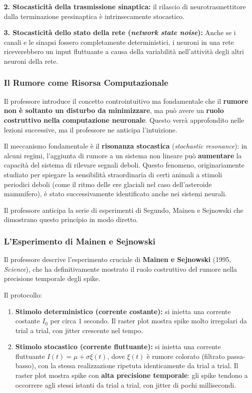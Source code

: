 \textbf{2. Stocasticità della trasmissione sinaptica:} il rilascio di neurotrasmettitore dalla terminazione presinaptica è intrinsecamente stocastico. 

\textbf{3. Stocasticità dello stato della rete (\textit{network state noise}):}
Anche se i canali e le sinapsi fossero completamente deterministici, i neuroni in una rete riceverebbero un input fluttuante a causa della variabilità nell'attività degli altri neuroni della rete. 

\subsubsection{Il Rumore come Risorsa Computazionale}

Il professore introduce il concetto controintuitivo ma fondamentale che il \textbf{rumore non è soltanto un disturbo da minimizzare}, ma può avere un \textbf{ruolo costruttivo nella computazione neuronale}. Questo verrà approfondito nelle lezioni successive, ma il professore ne anticipa l'intuizione.

Il meccanismo fondamentale è il \textbf{risonanza stocastica} (\textit{stochastic resonance}): in alcuni regimi, l'aggiunta di rumore a un sistema non lineare può \textbf{aumentare} la capacità del sistema di rilevare segnali deboli. Questo fenomeno, originariamente studiato per spiegare la sensibilità straordinaria di certi animali a stimoli periodici deboli (come il ritmo delle ere glaciali nel caso dell'asteroide mammifero), è stato successivamente identificato anche nei sistemi neurali.

Il professore anticipa la serie di esperimenti di Segundo, Mainen e Sejnowski che dimostrano questo principio in modo diretto.


\subsubsection{L'Esperimento di Mainen e Sejnowski}

Il professore descrive l'esperimento cruciale di \textbf{Mainen e Sejnowski} (1995, \textit{Science}), che ha definitivamente mostrato il ruolo costruttivo del rumore nella precisione temporale degli spike.

Il protocollo:
\begin{enumerate}
    \item \textbf{Stimolo deterministico (corrente costante):} si inietta una corrente costante $I_0$ per circa 1 secondo. Il raster plot mostra spike molto irregolari da trial a trial, con jitter crescente nel tempo.
    \item \textbf{Stimolo stocastico (corrente fluttuante):} si inietta una corrente fluttuante $I(t) = \mu + \sigma \xi(t)$, dove $\xi(t)$ è rumore colorato (filtrato passa-basso), con la stessa realizzazione ripetuta identicamente da trial a trial. Il raster plot mostra spike con \textbf{alta precisione temporale}: gli spike tendono a occorrere agli stessi istanti da trial a trial, con jitter di pochi millisecondi.
\end{enumerate}

